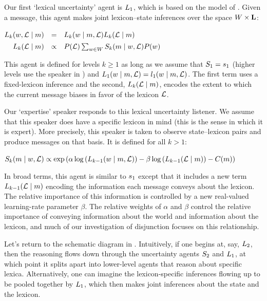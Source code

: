 \documentclass[12pt,twoside]{article}
\renewcommand{\_}{\textbf{\textunderscore\hspace{-4pt}\textunderscore\hspace{-3pt}\textunderscore\hspace{-4pt}\textunderscore}\hspace{0.5pt}}			%
\begin{document}
Our first `lexical uncertainty' agent is $\ListenerK[1]$, which is
based on the model of \citet{Smith:Goodman:Frank:2013}. Given a
message, this agent makes joint lexicon--state inferences over the
space $\States \times \LexSet$:
%
\begin{exe}
  \ex\label{L1}%
    \setlength{\arraycolsep}{2pt}%
    $\begin{array}[t]{@{} r c l}
      \ListenerK(\state, \Lex \given \msg) 
      &=&
      \ListenerK(\state \given \msg, \Lex) \ListenerK(\Lex \given \msg) 
      \\[1ex]
      \ListenerK(\Lex \given \msg) 
      &\propto& 
      \Prior(\Lex) \sum_{\state\in\States} \SpeakerK(\msg \given \state, \Lex)\Prior(\state)
    \end{array}$
\end{exe}
%
This agent is defined for levels $k \geqslant 1$ as long as we assume
that $\SpeakerK[1] = \speakerOne$ (higher levels use the speaker in
) and
$\ListenerK[1](\state \given \msg, \Lex) = \listenerOne(\state \given \msg, \Lex)$.
The first term uses a fixed-lexicon inference and the second,
$\ListenerK(\Lex \given \msg)$, encodes the extent to which the
current message biases in favor of the lexicon $\Lex$.

Our `expertise' speaker responds to this lexical uncertainty listener.
We assume that this speaker does have a specific lexicon in mind (this
is the sense in which it is expert).  More precisely, this speaker is
taken to observe state--lexicon pairs and produce messages on that
basis. It is defined for all $k > 1$:

\begin{exe}  
  \ex\label{Sk}%
   $\SpeakerK(\msg \given \state, \Lex) \propto \exponential \left( \alpha\log\left(\ListenerK[k-1](\state \given \msg, \Lex)\right)  -  \beta\log\left(\ListenerK[k-1](\Lex\given\msg)\right) - \Costs(\msg) \right)$
\end{exe}
%
In broad terms, this agent is similar to $\speakerOne$ except that it
includes a new term $\ListenerK[k-1](\Lex\given\msg)$ encoding the
information each message conveys about the lexicon. The relative
importance of this information is controlled by a new real-valued
learning-rate parameter $\beta$. The relative weights of $\alpha$ and
$\beta$ control the relative importance of conveying information about
the world and information about the lexicon, and much of our
investigation of disjunction focuses on this relationship.

Let's return to the schematic diagram in
. Intuitively, if one begins at, say,
$\ListenerK[2]$, then the reasoning flows down through the uncertainty
agents $\SpeakerK[2]$ and $\ListenerK[1]$, at which point it splits
apart into lower-level agents that reason about specific lexica.
Alternatively, one can imagine the lexicon-specific inferences flowing
up to be pooled together by $\ListenerK[1]$, which then makes joint
inferences about the state and the lexicon.
\end{document}
